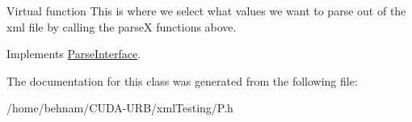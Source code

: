 Virtual function This is where we select what values we want to parse out of the xml file by calling the parseX functions above. 

Implements \hyperlink{classParseInterface_afca32108192ba0997c9e5a78189b0cbc}{Parse\+Interface}.



The documentation for this class was generated from the following file\+:\begin{DoxyCompactItemize}
\item 
/home/behnam/\+C\+U\+D\+A-\/\+U\+R\+B/xml\+Testing/P.\+h\end{DoxyCompactItemize}
